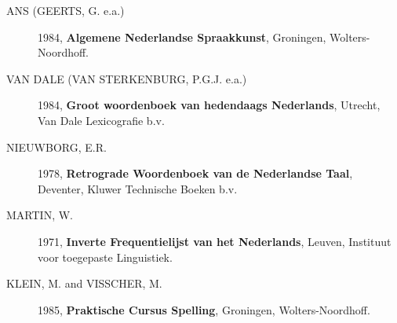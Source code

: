 \begin{description}
  \item [ANS (GEERTS, G. e.a.)]
     1984, {\bf Algemene Nederlandse Spraakkunst}, Groningen, Wolters-Noordhoff.

  \item [VAN DALE (VAN STERKENBURG, P.G.J. e.a.)]
     1984, {\bf Groot woordenboek van hedendaags Nederlands}, Utrecht, Van Dale 
           Lexicografie b.v.

  \item [NIEUWBORG, E.R.]
     1978, {\bf Retrograde Woordenboek van de Nederlandse Taal}, 
           Deventer, Kluwer Technische Boeken b.v.

  \item [MARTIN, W.]
     1971, {\bf Inverte Frequentielijst van het Nederlands}, 
           Leuven, Instituut voor toegepaste Linguistiek.

  \item [KLEIN, M. and VISSCHER, M.]
     1985, {\bf Praktische Cursus Spelling}, Groningen, Wolters-Noordhoff.

\end{description}


